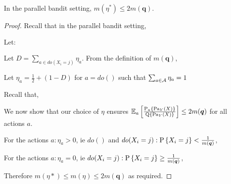 \begin{proposition}\label{pro:m-equivelence} In the parallel bandit setting,
$m(\eta^*) \leq 2m(\boldsymbol{q})$.
\end{proposition} 

\begin{proof}

Recall that in the parallel bandit setting,


Let:


Let $D =\sum_{a\in do(X_i=j)}\eta_a$. From the definition of $m(\boldsymbol{q})$, 
 
Let $\eta_a = \frac{1}{2} + (1-D)$ for $a = do()$ such that $\sum_{a \in \calA}\eta_a = 1$ 

Recall that,


We now show that our choice of $\eta$ ensures $\EEa\left[\frac{\Pn{a}{\parents{Y}(X)}}{\Q{\parents{Y}(X)}}\right] \leq 2m(\boldsymbol{q})$ for all actions $a$.

For the actions $a: \eta_a > 0$, ie $do()$ and $do(X_i = j):\P{X_i=j}<\frac{1}{m(\boldsymbol{q})}$,

For the actions $a :\eta_a = 0$, ie $do(X_i=j):\P{X_i=j}\geq\frac{1}{m(\boldsymbol{q})}$,

Therefore $m(\eta*) \leq m(\eta) \leq 2m(\boldsymbol{q})$ as required.

\end{proof}
\


